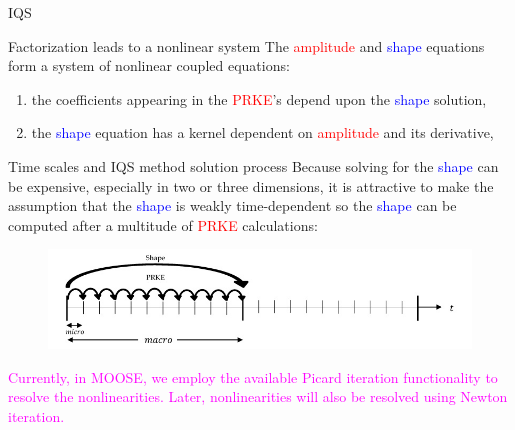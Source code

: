 \documentclass[8pt]{beamer}
\newcommand{\ben}{\begin{enumerate}}
\newcommand{\een}{\end{enumerate}}
\newcommand{\tcr}[1]{\textcolor{red}{#1}}
\newcommand{\tcb}[1]{\textcolor{blue}{#1}}
\newcommand{\tcm}[1]{\textcolor{magenta}{#1}}
\begin{document}
\begin{frame}{IQS}

\begin{block}{Factorization leads to a nonlinear system}
The \tcr{amplitude} and \tcb{shape} equations form a system of nonlinear coupled equations: 
\ben
\item the coefficients appearing in the \tcr{PRKE}'s depend upon the \tcb{shape} solution,
\item the \tcb{shape} equation has a kernel dependent on \tcr{amplitude} and its derivative,  
\een
\end{block}

\begin{block}{Time scales and IQS method solution process}
Because solving for the \tcb{shape} can be expensive, especially in two or three dimensions, it is attractive to make the assumption that the \tcb{shape} is weakly time-dependent so the \tcb{shape} can be computed after a multitude of \tcr{PRKE} calculations:
%

\begin{figure}[h]
\includegraphics[width=\linewidth]{figures/IQS_visualization.jpg}
\label{fig:IQS}
\end{figure}

\tcm{Currently, in MOOSE, we employ the available Picard iteration functionality to resolve the nonlinearities. Later, nonlinearities will also be resolved using Newton iteration.}
\end{block}
\end{frame}
\end{document}
